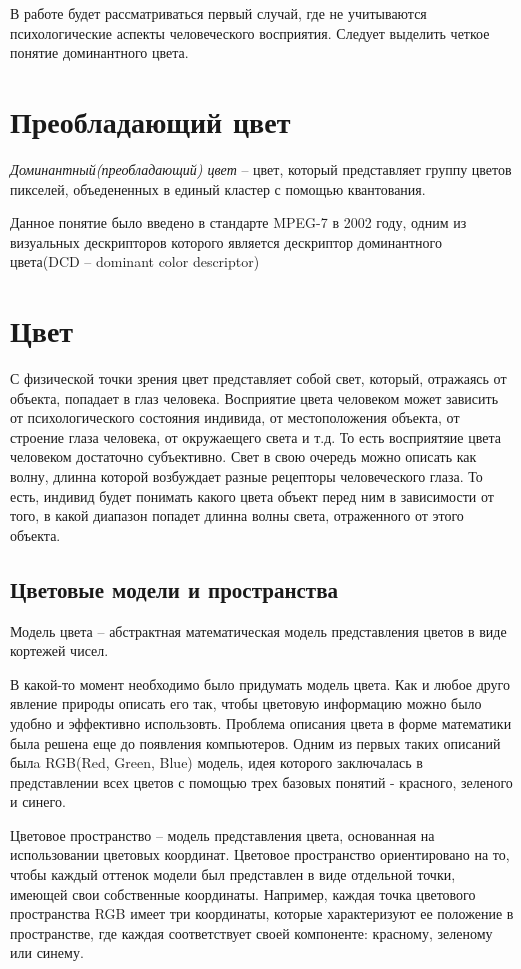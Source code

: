 В работе будет рассматриваться первый случай, где не учитываются психологические аспекты человеческого восприятия. Следует выделить четкое понятие доминантного цвета.

\section{ Преобладающий цвет}
\textit{Доминантный(преобладающий) цвет} -- цвет, который представляет группу цветов пикселей, объедененных в единый кластер с помощью квантования. 

Данное понятие было введено в стандарте MPEG-7 в 2002 году, одним из визуальных дескрипторов которого является дескриптор доминантного цвета(DCD -- dominant color descriptor)

\section{ Цвет}
С физической точки зрения цвет представляет собой свет, который, отражаясь от объекта, попадает в глаз человека. Восприятие цвета человеком может зависить от психологического состояния индивида, от местоположения объекта, от строение глаза человека, от окружаещего света и т.д. То есть восприятяие цвета человеком достаточно субъективно. Свет в свою очередь можно описать как волну, длинна которой возбуждает разные рецепторы человеческого глаза. То есть, индивид будет понимать какого цвета объект перед ним в зависимости от того, в какой диапазон попадет длинна волны света, отраженного от этого объекта.

\subsection{ Цветовые модели и пространства}

Модель цвета -- абстрактная математическая модель представления цветов в виде кортежей чисел.

В какой-то момент необходимо было придумать модель цвета. Как и любое друго явление природы описать его так, чтобы цветовую информацию можно было удобно и эффективно использовть. Проблема описания цвета в форме математики была решена еще до появления компьютеров. Одним из первых таких описаний былa RGB(Red, Green, Blue) модель, идея которого заключалась в представлении всех цветов с помощью трех базовых понятий - красного, зеленого и синего. 

Цветовое пространство -- модель представления цвета, основанная на использовании цветовых координат. Цветовое пространство ориентировано на то, чтобы каждый оттенок модели был представлен в виде отдельной точки, имеющей свои собственные координаты. Например, каждая точка цветового пространства RGB имеет три координаты, которые характеризуют ее положение в пространстве, где каждая соответствует своей компоненте: красному, зеленому или синему.

